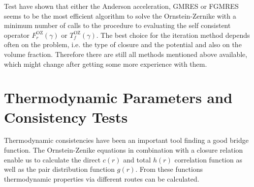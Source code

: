 Test have shown that either the Anderson acceleration, GMRES or FGMRES seems to be the most efficient algorithm to solve the Ornstein-Zernike with a minimum number of calls to the procedure to evaluating the self consistent operator $F^\mathrm{OZ}_r(\gamma)$ or $T^\mathrm{OZ}_f(\gamma)$. The best choice for the iteration method depends often on the problem, i.e. the type of closure and the potential and also on the volume fraction. Therefore there are still all methods mentioned above available, which might change after getting some more experience with them.

\section{Thermodynamic Parameters and Consistency Tests}

Thermodynamic consistencies have been an important tool finding a good bridge function.
The Ornstein-Zenike equations in combination with a closure relation enable us to calculate
the direct $c(r)$ and total $h(r)$ correlation function  as well as the pair distribution function $g(r)$.
From these functions thermodynamic properties via different routes can be calculated.

